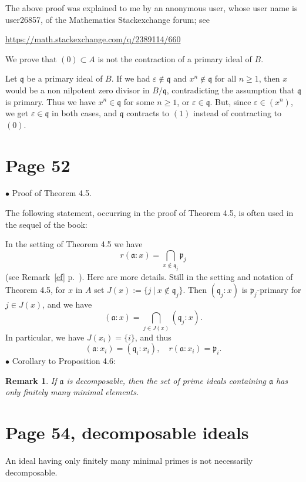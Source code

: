 \documentclass[12pt]{article}
\newcommand{\mf}{\mathfrak}
\newcommand{\bu}{\bullet}
\newtheorem{rk}[thm]{Remark}
\begin{document}
The above proof was explained to me by an anonymous user, whose user name is user26857, of the Mathematics Stackexchange forum; see 

\href{https://math.stackexchange.com/q/2389114/660}{https://math.stackexchange.com/q/2389114/660}

We prove that $(0)\subset A$ is not the contraction of a primary ideal of $B$.

Let $\mathfrak q$ be a primary ideal of $B$. If we had $\varepsilon\notin\mathfrak q$ and $x^n\notin\mathfrak q$ for all $n\ge1$, then $x$ would be a non nilpotent zero divisor in $B/\mathfrak q$, contradicting the assumption that $\mathfrak q$ is primary. Thus we have $x^n\in\mathfrak q$ for some $n\ge1$, or $\varepsilon\in\mathfrak q$. But, since $\varepsilon\in(x^n)$, we get $\varepsilon\in\mathfrak q$ in both cases, and $\mathfrak q$ contracts to $(1)$ instead of contracting to $(0)$.

\section{Page 52}%

$\bu$ Proof of Theorem 4.5.

The following statement, occurring in the proof of Theorem 4.5, is often used in the sequel of the book:

In the setting of Theorem 4.5 we have 
$$
r(\mf a:x)=\bigcap_{x\notin\mf q_j}\mf p_j
$$
(see Remark~\ref{ef} p.~\pageref{ef}). Here are more details. Still in the setting and notation of Theorem 4.5, for $x$ in $A$ set $J(x):=\{j\ |\ x\notin\mf q_j\}$. Then $(\mf q_j:x)$ is $\mf p_j$-primary for $j\in J(x)$, and we have 
$$
(\mf a:x)=\bigcap_{j\in J(x)}(\mf q_j:x).
$$ 
In particular, we have $J(x_i)=\{i\}$, and thus 
$$
(\mf a:x_i)=(\mf q_i:x_i),\quad r(\mf a:x_i)=\mf p_i.
$$
$\bu$ Corollary to Proposition 4.6:

\begin{rk}\label{fmme}
If $\mf a$ is decomposable, then the set of prime ideals containing $\mf a$ has only finitely many minimal elements.
\end{rk}

\section{Page 54, decomposable ideals}\label{di}%

An ideal having only finitely many minimal primes is not necessarily decomposable.
\end{document}

